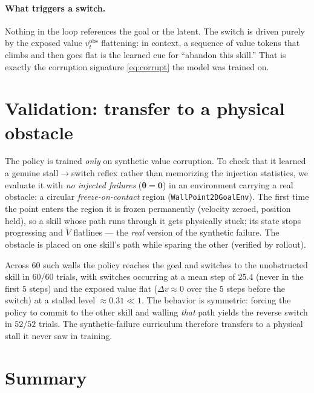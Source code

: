 \documentclass[11pt]{article}
\newcommand{\Vnorm}{\widetilde{V}}
\newcommand{\theem}{\bm{\theta}}
\newcommand{\code}[1]{\texttt{\small #1}}
\begin{document}
\paragraph{What triggers a switch.}
Nothing in the loop references the goal or the latent. The switch is driven purely by
the exposed value $v^{\mathrm{obs}}_t$ flattening: in context, a sequence of value
tokens that climbs and then goes flat is the learned cue for ``abandon this skill.''
That is exactly the corruption signature \eqref{eq:corrupt} the model was trained on.

\section{Validation: transfer to a physical obstacle}
\label{sec:validation}

The policy is trained \emph{only} on synthetic value corruption. To check that it
learned a genuine stall$\to$switch reflex rather than memorizing the injection
statistics, we evaluate it with \emph{no injected failures} ($\theem=\mathbf 0$) in an
environment carrying a real obstacle: a circular \emph{freeze-on-contact} region
(\code{WallPoint2DGoalEnv}). The first time the point enters the region it is frozen
permanently (velocity zeroed, position held), so a skill whose path runs through it
gets physically stuck; its state stops progressing and $\Vnorm$ flatlines --- the
\emph{real} version of the synthetic failure. The obstacle is placed on one skill's
path while sparing the other (verified by rollout).

Across $60$ such walls the policy reaches the goal and switches to the unobstructed
skill in $60/60$ trials, with switches occurring at a mean step of $25.4$ (never in
the first $5$ steps) and the exposed value flat ($\Delta v\approx 0$ over the $5$ steps
before the switch) at a stalled level $\approx0.31\ll 1$. The behavior is symmetric:
forcing the policy to commit to the other skill and walling \emph{that} path yields the
reverse switch in $52/52$ trials. The synthetic-failure curriculum therefore transfers
to a physical stall it never saw in training.

\section{Summary}
\label{sec:summary}
\end{document}
